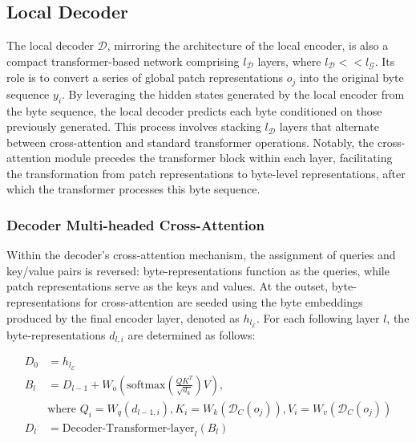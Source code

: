 \subsection{Local Decoder} 

The local decoder $\mathcal{D}$, mirroring the architecture of the local encoder, is also a compact transformer-based network comprising $l_{\mathcal{D}}$ layers, where $l_{\mathcal{D}} << l_{\mathcal{G}}$. Its role is to convert a series of global patch representations $o_j$ into the original byte sequence $y_i$. By leveraging the hidden states generated by the local encoder from the byte sequence, the local decoder predicts each byte conditioned on those previously generated. This process involves stacking $l_{\mathcal{D}}$ layers that alternate between cross-attention and standard transformer operations. Notably, the cross-attention module precedes the transformer block within each layer, facilitating the transformation from patch representations to byte-level representations, after which the transformer processes this byte sequence.

\subsubsection{Decoder Multi-headed Cross-Attention} 

Within the decoder’s cross-attention mechanism, the assignment of queries and key/value pairs is reversed: byte-representations function as the queries, while patch representations serve as the keys and values. At the outset, byte-representations for cross-attention are seeded using the byte embeddings produced by the final encoder layer, denoted as $h_{l_{\mathcal{E}}}$. For each following layer $l$, the byte-representations $d_{l,i}$ are determined as follows:

\begin{align}
D_0 &= h_{l_{\mathcal{E}}} \\
B_l &= D_{l-1} + W_o\left(\text{softmax}\left(\frac{QK^T}{\sqrt{d_k}}\right)V\right), \\
  &\text{where } Q_i = W_q(d_{l-1,i}), K_i = W_k(\mathcal{D}_C(o_j)), V_i = W_v(\mathcal{D}_C(o_j)) \\
  D_l &= \text{Decoder-Transformer-layer}_l(B_l)
\end{align}

